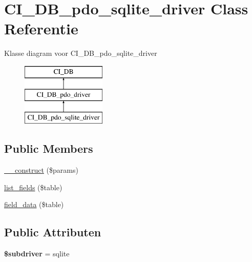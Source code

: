 \hypertarget{class_c_i___d_b__pdo__sqlite__driver}{}\section{C\+I\+\_\+\+D\+B\+\_\+pdo\+\_\+sqlite\+\_\+driver Class Referentie}
\label{class_c_i___d_b__pdo__sqlite__driver}
Klasse diagram voor C\+I\+\_\+\+D\+B\+\_\+pdo\+\_\+sqlite\+\_\+driver\begin{figure}[H]
\begin{center}
\leavevmode
\includegraphics[height=3.000000cm]{class_c_i___d_b__pdo__sqlite__driver}
\end{center}
\end{figure}
\subsection*{Public Members}
\begin{DoxyCompactItemize}
\item 
\mbox{\hyperlink{class_c_i___d_b__pdo__sqlite__driver_a9162320adff1a1a4afd7f2372f753a3e}{\+\_\+\+\_\+construct}} (\$params)
\item 
\mbox{\hyperlink{class_c_i___d_b__pdo__sqlite__driver_aef08cd376b16b24608100ca0e3f2f85b}{list\+\_\+fields}} (\$table)
\item 
\mbox{\hyperlink{class_c_i___d_b__pdo__sqlite__driver_a90355121e1ed009e0efdbd544ab56efa}{field\+\_\+data}} (\$table)
\end{DoxyCompactItemize}
\subsection*{Public Attributen}
\begin{DoxyCompactItemize}
\item 
\mbox{\label{class_c_i___d_b__pdo__sqlite__driver_a1322ca756348b11d080cb7a4f590de15}} 
{\bfseries \$subdriver} = \textquotesingle{}sqlite\textquotesingle{}
\end{DoxyCompactItemize}

